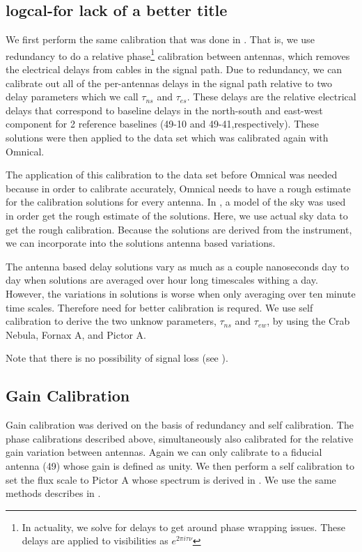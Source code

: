\documentclass[twocolumn,numberedappendix]{emulateapj}
\begin{document}
{\subsection{logcal-for lack of a better title}
We first perform the same calibration that was
done in \citep{parsons_et_al2014a}. That is, we use redundancy to do a relative
phase\footnote{In actuality, we solve for delays to get around phase wrapping
issues. These delays are applied to visibilities as $e^{2\pi{i}\tau\nu}$}
calibration between antennas, which removes the electrical delays from cables in
the signal path. Due to redundancy, we can calibrate out all of the per-antennas
delays in the signal path relative to two delay parameters which we call
$\tau_{ns}$ and $\tau_{es}$. These delays are the relative electrical delays
that correspond to baseline delays in the north-south and east-west component
for 2 reference baselines (49-10 and 49-41,respectively). These solutions were
then applied to the data set which was calibrated again with Omnical. 

The application of this calibration to the data set before Omnical was needed
because in order to calibrate accurately, Omnical needs to have a rough estimate
for the calibration solutions for every antenna. In \cite{zheng_et_al2014}, a
model of the sky was used in order get the rough estimate of the solutions.
Here, we use actual sky data to get the rough calibration. Because the solutions
are derived from the instrument, we can incorporate into the solutions antenna
based variations. 
 
The antenna based
delay solutions vary as much as a couple nanoseconds day to day when solutions
are averaged over hour long timescales withing a day. However, the variations in
solutions is worse when only averaging over ten minute time scales. Therefore
need for better calibration is requred.  We use self calibration to derive the
two unknow parameters, $\tau_{ns}$ and $\tau_{ew}$, by using the Crab Nebula,
Fornax A, and Pictor A.

Note that there is no possibility of signal loss (see \citep{parsons_et_al2014a}).

\subsection{Gain Calibration}
Gain calibration was derived on the basis of redundancy and self calibration.
The phase calibrations described above, simultaneously also calibrated for the
relative gain variation between antennas. Again we can only calibrate to a fiducial
antenna (49) whose gain is defined as unity. We then perform a self calibration
to set the flux scale to Pictor A whose spectrum is derived in
\citep{jacobs_et_al2013}. We use the same methods describes in \citep{parsons_et_al2014a}.

}
\end{document}
